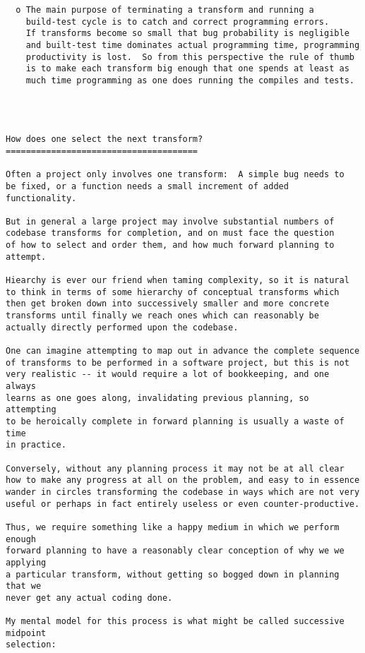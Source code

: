 \begin{verbatim}
  o The main purpose of terminating a transform and running a
    build-test cycle is to catch and correct programming errors.
    If transforms become so small that bug probability is negligible
    and built-test time dominates actual programming time, programming
    productivity is lost.  So from this perspective the rule of thumb
    is to make each transform big enough that one spends at least as
    much time programming as one does running the compiles and tests.




How does one select the next transform?
======================================

Often a project only involves one transform:  A simple bug needs to
be fixed, or a function needs a small increment of added functionality.

But in general a large project may involve substantial numbers of
codebase transforms for completion, and on must face the question
of how to select and order them, and how much forward planning to
attempt.

Hiearchy is ever our friend when taming complexity, so it is natural
to think in terms of some hierarchy of conceptual transforms which
then get broken down into successively smaller and more concrete
transforms until finally we reach ones which can reasonably be
actually directly performed upon the codebase.

One can imagine attempting to map out in advance the complete sequence
of transforms to be performed in a software project, but this is not
very realistic -- it would require a lot of bookkeeping, and one always
learns as one goes along, invalidating previous planning, so attempting
to be heroically complete in forward planning is usually a waste of time
in practice.

Conversely, without any planning process it may not be at all clear
how to make any progress at all on the problem, and easy to in essence
wander in circles transforming the codebase in ways which are not very
useful or perhaps in fact entirely useless or even counter-productive.

Thus, we require something like a happy medium in which we perform enough
forward planning to have a reasonably clear conception of why we we applying
a particular transform, without getting so bogged down in planning that we
never get any actual coding done.

My mental model for this process is what might be called successive midpoint
selection:


\end{verbatim}
